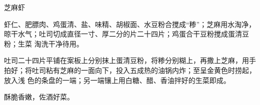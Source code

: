 %
%
%
%
%
%
%
\begin{recipe}{芝麻虾}

\ingredients


\preparation

\step 虾仁、肥膘肉、鸡蛋清、盐、味精、胡椒面、水豆粉合搅成“糁”；芝麻用水淘净，
晾干水气；吐司切成直径一寸、厚二分的片二十四片；鸡蛋合干豆粉搅成蛋清豆粉；生菜
淘洗干净待用。

\step 吐司二十四片平铺在案板上分别抹上蛋清豆粉，将糁分别糊上，再撒上芝麻，用手
拍好；将吐司粘有芝麻的一面向下，投入五成热的油锅内炸；至呈金黄色时捞起，放入浅
色的条盘的一端；另一端镶上用白糖、醋、香油拌好的生菜即成。

\features

酥脆香嫩，佐酒好菜。

\end{recipe}

